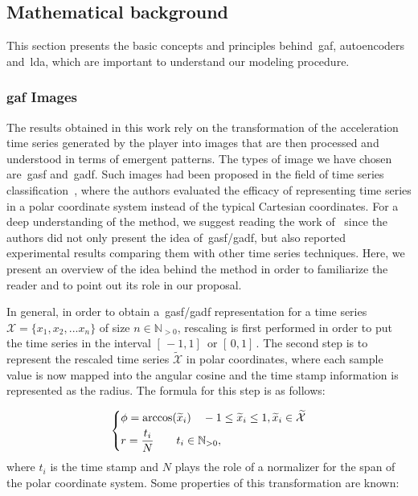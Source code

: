 \subsection{Mathematical background}
This section presents the basic concepts and principles behind~\gls{gaf}, autoencoders and~\gls{lda}, which are important to understand our modeling procedure.

\subsubsection{\glsdesc{gaf} Images}

The results obtained in this work rely on the transformation of the acceleration time series generated by the player into images that are then processed and understood in terms of emergent patterns. The types of image we have chosen are~\gls{gasf} and~\gls{gadf}. Such images had been proposed in the field of time series classification~\citep{wang_imaging_2015}, where the authors evaluated the efficacy of representing time series in a polar coordinate system instead of the typical Cartesian coordinates. For a deep understanding of the method, we suggest reading the work of~\cite{wang_imaging_2015} since the authors did not only present the idea of~\gls{gasf}/\gls{gadf}, but also reported experimental results comparing them with other time series techniques. Here, we present an overview of the idea behind the method in order to familiarize the reader and to point out its role in our proposal.

In general, in order to obtain a~\gls{gasf}/\gls{gadf} representation for a time series $\mathcal{X}=\{x_{1}, x_{2}, ... x_{n}\}$ of size $n \in \mathbb{N}_{>0}$, rescaling is first performed in order to put the time series in the interval $[\,-1,1] \,$ or $[\,0,1]\,$. The second step is to represent the rescaled time series $\widetilde{\mathcal{X}}$ in polar coordinates, where each sample value is now mapped into the angular cosine and the time stamp information is represented as the radius. 
The formula for this step is as follows:

\begin{equation}
\begin{dcases}
  \phi = \arccos(\widetilde{x}_{i}) \quad -1 \leq \widetilde{x}_{i} \leq 1, \widetilde{x}_{i} \in \widetilde{\mathcal{X}} \\
  r = \frac{t_{i}}{N} \quad \quad t_{i} \in \mathbb{N}_{>0},
\end{dcases}
\label{equation:GAF}
\end{equation} 
where $t_{i}$ is the time stamp and $N$ plays the role of a normalizer for the span of the polar coordinate system. Some properties of this transformation are known:

